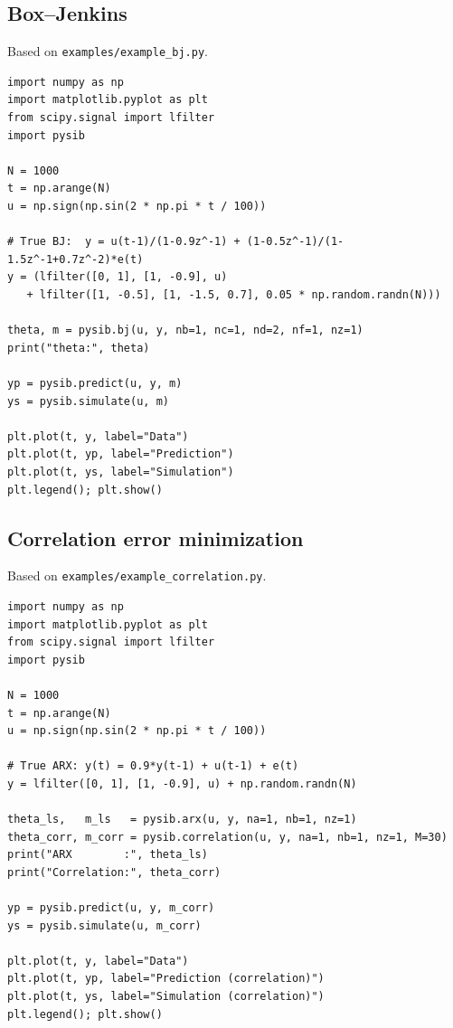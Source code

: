 \documentclass[11pt,a4paper]{article}
\begin{document}
\subsection{Box--Jenkins}

Based on \texttt{examples/example\_bj.py}.

\begin{lstlisting}
import numpy as np
import matplotlib.pyplot as plt
from scipy.signal import lfilter
import pysib

N = 1000
t = np.arange(N)
u = np.sign(np.sin(2 * np.pi * t / 100))

# True BJ:  y = u(t-1)/(1-0.9z^-1) + (1-0.5z^-1)/(1-1.5z^-1+0.7z^-2)*e(t)
y = (lfilter([0, 1], [1, -0.9], u)
   + lfilter([1, -0.5], [1, -1.5, 0.7], 0.05 * np.random.randn(N)))

theta, m = pysib.bj(u, y, nb=1, nc=1, nd=2, nf=1, nz=1)
print("theta:", theta)

yp = pysib.predict(u, y, m)
ys = pysib.simulate(u, m)

plt.plot(t, y, label="Data")
plt.plot(t, yp, label="Prediction")
plt.plot(t, ys, label="Simulation")
plt.legend(); plt.show()
\end{lstlisting}

\subsection{Correlation error minimization}

Based on \texttt{examples/example\_correlation.py}.

\begin{lstlisting}
import numpy as np
import matplotlib.pyplot as plt
from scipy.signal import lfilter
import pysib

N = 1000
t = np.arange(N)
u = np.sign(np.sin(2 * np.pi * t / 100))

# True ARX: y(t) = 0.9*y(t-1) + u(t-1) + e(t)
y = lfilter([0, 1], [1, -0.9], u) + np.random.randn(N)

theta_ls,   m_ls   = pysib.arx(u, y, na=1, nb=1, nz=1)
theta_corr, m_corr = pysib.correlation(u, y, na=1, nb=1, nz=1, M=30)
print("ARX        :", theta_ls)
print("Correlation:", theta_corr)

yp = pysib.predict(u, y, m_corr)
ys = pysib.simulate(u, m_corr)

plt.plot(t, y, label="Data")
plt.plot(t, yp, label="Prediction (correlation)")
plt.plot(t, ys, label="Simulation (correlation)")
plt.legend(); plt.show()
\end{lstlisting}
\end{document}
